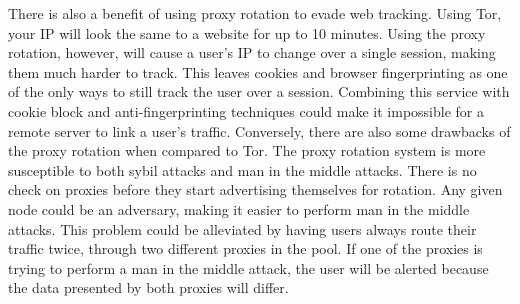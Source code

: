 There is also a benefit of using proxy rotation to evade web tracking. Using Tor, your IP will look the same to a website for up to 10 minutes\cite{tor:faq}. Using the proxy rotation, however, will cause a user's IP to change over a single session, making them much harder to track. This leaves cookies and browser fingerprinting as one of the only ways to still track the user over a session. Combining this service with cookie block and anti-fingerprinting techniques could make it impossible for a remote server to link a user's traffic.
    Conversely, there are also some drawbacks of the proxy rotation when compared to Tor. The proxy rotation system is more susceptible to both sybil attacks and man in the middle attacks. There is no check on proxies before they start advertising themselves for rotation. Any given node could be an adversary, making it easier to perform man in the middle attacks. This problem could be alleviated by having users always route their traffic twice, through two different proxies in the pool. If one of the proxies is trying to perform a man in the middle attack, the user will be alerted because the data presented by both proxies will differ. 